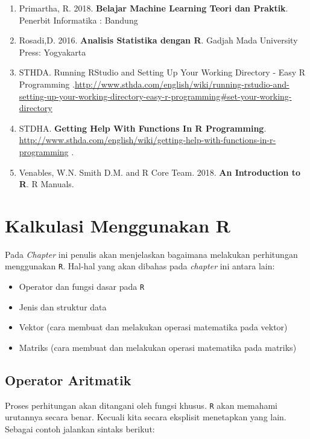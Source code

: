 \documentclass[
]{book}
\providecommand{\tightlist}{%
  \setlength{\itemsep}{0pt}\setlength{\parskip}{0pt}}
\theoremstyle{definition}
\theoremstyle{definition}
\theoremstyle{definition}
\theoremstyle{definition}
\theoremstyle{remark}
\begin{document}
\begin{enumerate}
\def\labelenumi{\arabic{enumi}.}
\tightlist
\item
  Primartha, R. 2018. \textbf{Belajar Machine Learning Teori dan Praktik}. Penerbit Informatika : Bandung
\item
  Rosadi,D. 2016. \textbf{Analisis Statistika dengan R}. Gadjah Mada University Press: Yogyakarta
\item
  STHDA. Running RStudio and Setting Up Your Working Directory - Easy R Programming .\url{http://www.sthda.com/english/wiki/running-rstudio-and-setting-up-your-working-directory-easy-r-programming\#set-your-working-directory}
\item
  STDHA. \textbf{Getting Help With Functions In R Programming}. \url{http://www.sthda.com/english/wiki/getting-help-with-functions-in-r-programming} .
\item
  Venables, W.N. Smith D.M. and R Core Team. 2018. \textbf{An Introduction to R}. R Manuals.
\end{enumerate}

\hypertarget{calculation}{%
\chapter{Kalkulasi Menggunakan R}\label{calculation}}

Pada \emph{Chapter} ini penulis akan menjelaskan bagaimana melakukan perhitungan menggunakan \texttt{R}. Hal-hal yang akan dibahas pada \emph{chapter} ini antara lain:

\begin{itemize}
\tightlist
\item
  Operator dan fungsi dasar pada \texttt{R}
\item
  Jenis dan struktur data
\item
  Vektor (cara membuat dan melakukan operasi matematika pada vektor)
\item
  Matriks (cara membuat dan melakukan operasi matematika pada matriks)
\end{itemize}

\hypertarget{aritmetikoperator}{%
\section{Operator Aritmatik}\label{aritmetikoperator}}

Proses perhitungan akan ditangani oleh fungsi khusus. \texttt{R} akan memahami urutannya secara benar. Kecuali kita secara eksplisit menetapkan yang lain. Sebagai contoh jalankan sintaks berikut:
\end{document}
